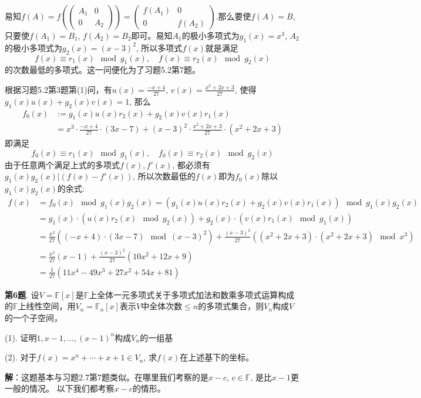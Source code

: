 易知$f(A) = f(\begin{pmatrix} A_1 & 0 \\ 0 & A_2 \end{pmatrix}) = \begin{pmatrix} f(A_1) & 0 \\ 0 & f(A_2) \end{pmatrix}$.那么要使$f(A) = B$, 只要使$f(A_1) = B_1$, $f(A_2) = B_2$即可。易知$A_1$的极小多项式为$g_1(x) = x^3$, $A_2$的极小多项式为$g_2(x) = (x-3)^2$, 所以多项式$f(x)$就是满足
$$f(x) \equiv r_1(x) \mod g_1(x), \quad f(x) \equiv r_2(x) \mod g_2(x)$$
的次数最低的多项式。这一问便化为了习题5.2第7题。

根据习题5.2第3题第(1)问，有$u(x) = \frac{-x+4}{27}$, $v(x) = \frac{x^2+2x+3}{27}$, 使得$g_1(x)u(x) + g_2(x)v(x) = 1$, 那么
\begin{align*}
f_0(x) & := g_1(x)u(x)r_2(x) + g_2(x)v(x)r_1(x) \\
& = x^3 \cdot \frac{-x+4}{27} \cdot (3x-7) + (x-3)^2 \cdot \frac{x^2+2x+3}{27} \cdot (x^2+2x+3)
\end{align*}
即满足
$$f_0(x) \equiv r_1(x) \mod g_1(x), \quad f_0(x) \equiv r_2(x) \mod g_2(x)$$
由于任意两个满足上式的多项式$f(x),f'(x)$, 都必须有$g_1(x)g_2(x) | (f(x)-f'(x))$, 所以次数最低的$f(x)$即为$f_0(x)$除以$g_1(x)g_2(x)$的余式:
\begin{align*}
f(x) & = f_0(x) \mod g_1(x)g_2(x) = (g_1(x)u(x)r_2(x) + g_2(x)v(x)r_1(x)) \mod g_1(x)g_2(x) \\
& = g_1(x) \cdot (u(x)r_2(x) \mod g_2(x)) + g_2(x) \cdot (v(x)r_1(x) \mod g_1(x)) \\
& = \frac{x^3}{27} ( (-x+4) \cdot (3x-7) \mod (x-3)^2) + \frac{(x-3)^2}{27}( (x^2+2x+3) \cdot (x^2+2x+3) \mod x^3) \\
& = \frac{x^3}{27} (x-1) + \frac{(x-3)^2}{27}(10x^2+12x+9) \\
& = \frac{1}{27}(11x^4 - 49x^3 + 27x^2 + 54x + 81)
\end{align*}

\newpageorvspace


{\bf 第6题}. 设$V = \mathbb{F}[x]$是$\mathbb{F}$上全体一元多项式关于多项式加法和数乘多项式运算构成的$\mathbb{F}$上线性空间，用$V_n = \mathbb{F}_n[x]$表示$V$中全体次数$\leqslant n$的多项式集合，则$V_n$构成$V$的一个子空间，

(1). 证明$1, x-1, \ldots, (x-1)^n$构成$V_n$的一组基

(2). 对于$f(x) = x^n + \cdots + x + 1 \in V_n$, 求$f(x)$在上述基下的坐标。

{\bf 解}：这题基本与习题2.7第7题类似。在哪里我们考察的是$x-c$, $c\in\mathbb{F}$, 是比$x-1$更一般的情况。 以下我们都考察$x-c$的情形。


